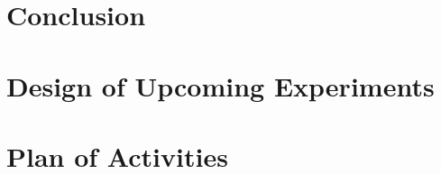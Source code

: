 \documentclass{article} %
\begin{document}
\section{Conclusion}

\section{Design of Upcoming Experiments}

\section{Plan of Activities}



\end{document}
